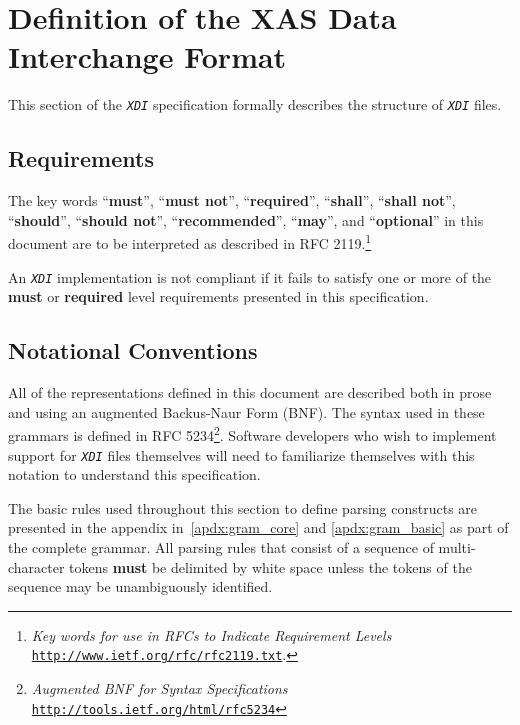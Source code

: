 \documentclass{article}
\newcommand{\sltt}[1]{\texttt{\textsl{#1}}}
\newcommand{\xdi}{\sltt{XDI}}
\begin{document}
\section{Definition of the XAS Data Interchange Format}
\label{sec:def_ixsif}

This section of the {\xdi} specification formally describes the
structure of {\xdi} files.

\subsection{Requirements}
\label{sec:def_requirements}

The key words ``\textbf{must}'', ``\textbf{must not}'',
``\textbf{required}'', ``\textbf{shall}'', ``\textbf{shall not}'',
``\textbf{should}'', ``\textbf{should not}'',
``\textbf{recommended}'', ``\textbf{may}'', and ``\textbf{optional}''
in this document are to be interpreted as described in RFC
2119.\footnote{\textit{Key words for use in RFCs to Indicate
    Requirement Levels} \href{http://www.ietf.org/rfc/rfc2119.txt}
  {\texttt{http://www.ietf.org/rfc/rfc2119.txt}}.}

An {\xdi} implementation is not compliant if it fails to satisfy
one or more of the \textbf{must} or \textbf{required} level
requirements presented in this specification.

\subsection{Notational Conventions}
\label{sec:def_notation}

All of the representations defined in this document are described both
in prose and using an augmented Backus-Naur Form (BNF).  The syntax
used in these grammars is defined in RFC
5234\footnote{\textit{Augmented BNF for Syntax Specifications}
  \href{http://tools.ietf.org/html/rfc5234}
  {\texttt{http://tools.ietf.org/html/rfc5234}}}.
Software developers who wish to implement support for {\xdi} files
themselves will need to familiarize themselves with this notation to
understand this specification.

The basic rules used throughout this section to define parsing
constructs are presented in the appendix in~\ref{apdx:gram_core} and
\ref{apdx:gram_basic} as part of the complete grammar. All parsing
rules that consist of a sequence of multi-character tokens
\textbf{must} be delimited by white space unless the tokens of the
sequence may be unambiguously identified.
\end{document}
